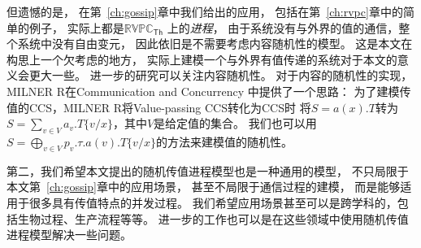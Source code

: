 但遗憾的是，
在第~\ref{ch:gossip}章中我们给出的应用，
包括在第~\ref{ch:rvpc}章中的简单的例子，
实际上都是$\mathbb{RVPC}_{\mathsf{Th}}$
上的\textit{进程}，
由于系统没有与外界的值的通信，整个系统中没有自由变元，
因此依旧是不需要考虑内容随机性的模型。
这是本文在构思上一个欠考虑的地方，
实际上建模一个与外界有值传递的系统对于本文的意义会更大一些。
进一步的研究可以关注内容随机性。
对于内容的随机性的实现，MILNER R在Communication and Concurrency\cite{Milner_CCS}
中提供了一个思路：
为了建模传值的CCS，MILNER R将Value-passing CCS转化为CCS时
将$S=a(x).T$转为$S=\sum_{v\in V} a_v.T\{v/x\}$，其中$V$是给定值的集合。
我们也可以用$S=\bigoplus_{v\in V}p_v.\tau.a(v).T\{v/x\}$的方法来建模值的随机性。

第二，我们希望本文提出的随机传值进程模型也是一种通用的模型，
不只局限于本文第~\ref{ch:gossip}章中的应用场景，
甚至不局限于通信过程的建模，
而是能够适用于很多具有传值特点的并发过程。
我们希望应用场景甚至可以是跨学科的，包括生物过程、生产流程等等。
进一步的工作也可以是在这些领域中使用随机传值进程模型解决一些问题。